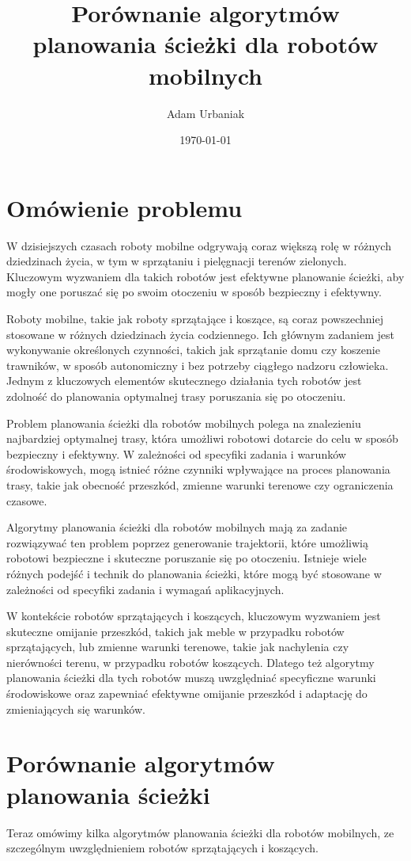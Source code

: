 \documentclass[10pt,a4paper]{article}
\author{Adam Urbaniak}
\title{Porównanie algorytmów planowania ścieżki dla robotów mobilnych}
\date{\today}
\begin{document}
\maketitle

\section{Omówienie problemu}
W dzisiejszych czasach roboty mobilne odgrywają coraz większą rolę w różnych dziedzinach życia, w tym w sprzątaniu i pielęgnacji terenów zielonych. Kluczowym wyzwaniem dla takich robotów jest efektywne planowanie ścieżki, aby mogły one poruszać się po swoim otoczeniu w sposób bezpieczny i efektywny.

Roboty mobilne, takie jak roboty sprzątające i koszące, są coraz powszechniej stosowane w różnych dziedzinach życia codziennego. Ich głównym zadaniem jest wykonywanie określonych czynności, takich jak sprzątanie domu czy koszenie trawników, w sposób autonomiczny i bez potrzeby ciągłego nadzoru człowieka. Jednym z kluczowych elementów skutecznego działania tych robotów jest zdolność do planowania optymalnej trasy poruszania się po otoczeniu.

Problem planowania ścieżki dla robotów mobilnych polega na znalezieniu najbardziej optymalnej trasy, która umożliwi robotowi dotarcie do celu w sposób bezpieczny i efektywny. W zależności od specyfiki zadania i warunków środowiskowych, mogą istnieć różne czynniki wpływające na proces planowania trasy, takie jak obecność przeszkód, zmienne warunki terenowe czy ograniczenia czasowe.

Algorytmy planowania ścieżki dla robotów mobilnych mają za zadanie rozwiązywać ten problem poprzez generowanie trajektorii, które umożliwią robotowi bezpieczne i skuteczne poruszanie się po otoczeniu. Istnieje wiele różnych podejść i technik do planowania ścieżki, które mogą być stosowane w zależności od specyfiki zadania i wymagań aplikacyjnych.

W kontekście robotów sprzątających i koszących, kluczowym wyzwaniem jest skuteczne omijanie przeszkód, takich jak meble w przypadku robotów sprzątających, lub zmienne warunki terenowe, takie jak nachylenia czy nierówności terenu, w przypadku robotów koszących. Dlatego też algorytmy planowania ścieżki dla tych robotów muszą uwzględniać specyficzne warunki środowiskowe oraz zapewniać efektywne omijanie przeszkód i adaptację do zmieniających się warunków.

\section{Porównanie algorytmów planowania ścieżki}
Teraz omówimy kilka algorytmów planowania ścieżki dla robotów mobilnych, ze szczególnym uwzględnieniem robotów sprzątających i koszących.
\end{document}
